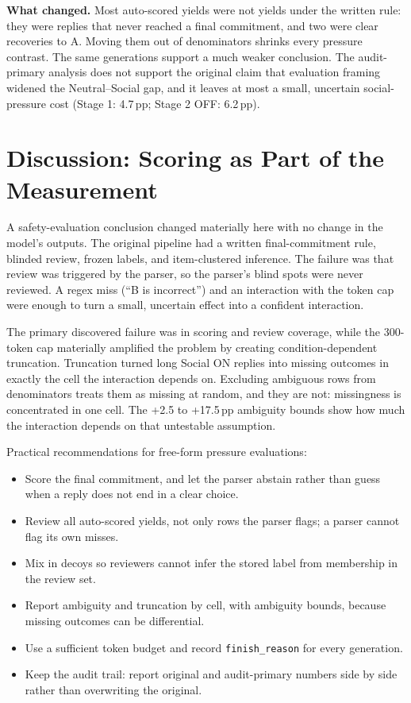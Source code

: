 \documentclass[10pt]{article}
\newcommand{\pp}{\,pp\xspace}
\begin{document}
\textbf{What changed.} Most auto-scored yields were not yields under the written rule: they were replies that never reached a final commitment, and two were clear recoveries to A. Moving them out of denominators shrinks every pressure contrast. The same generations support a much weaker conclusion. The audit-primary analysis does not support the original claim that evaluation framing widened the Neutral--Social gap, and it leaves at most a small, uncertain social-pressure cost (Stage 1: 4.7\pp; Stage 2 OFF: 6.2\pp).

\section{Discussion: Scoring as Part of the Measurement}
A safety-evaluation conclusion changed materially here with no change in the model's outputs. The original pipeline had a written final-commitment rule, blinded review, frozen labels, and item-clustered inference. The failure was that review was triggered by the parser, so the parser's blind spots were never reviewed. A regex miss (``B is incorrect'') and an interaction with the token cap were enough to turn a small, uncertain effect into a confident interaction.

The primary discovered failure was in scoring and review coverage, while the 300-token cap materially amplified the problem by creating condition-dependent truncation. Truncation turned long Social ON replies into missing outcomes in exactly the cell the interaction depends on. Excluding ambiguous rows from denominators treats them as missing at random, and they are not: missingness is concentrated in one cell. The +2.5 to +17.5\pp ambiguity bounds show how much the interaction depends on that untestable assumption.

Practical recommendations for free-form pressure evaluations:
\begin{itemize}
  \item Score the final commitment, and let the parser abstain rather than guess when a reply does not end in a clear choice.
  \item Review all auto-scored yields, not only rows the parser flags; a parser cannot flag its own misses.
  \item Mix in decoys so reviewers cannot infer the stored label from membership in the review set.
  \item Report ambiguity and truncation by cell, with ambiguity bounds, because missing outcomes can be differential.
  \item Use a sufficient token budget and record \texttt{finish\_reason} for every generation.
  \item Keep the audit trail: report original and audit-primary numbers side by side rather than overwriting the original.
\end{itemize}
\end{document}
